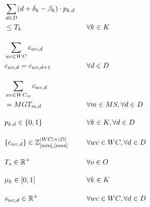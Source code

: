 \documentclass[runningheads]{llncs}
\begin{document}
\begin{alignat}{2}
    &\sum_{d \in D} (d + \delta_k - \beta_k) \cdot p_{k,d}                                      \ \ && \notag \\
    &\leq  T_k                                                                                  \ \ && \forall k \in K                              \label{eqn:tactical_tardiness} \\[1em]
    &\sum_{wc \in WC} c_{wc,d}                                                                  \ \ && \notag \\
    &c_{wc,d} = c_{wc,d+1}                                                                      \ \ && \forall d \in D                              \label{eqn:tactical_consistent_crew} \\[1em]
    &\sum_{wc \in WC_{m}} c_{wc,d}                                                              \ \ && \notag \\
    & = MGT_{m,d}                                                                               \ \ && \forall m \in MS, \forall d \in D            \label{eqn:tactical_multiskill} \\[1em]
    &p_{k,d} \in \{0,1\}                                                                        \ \ && \forall k \in K, \forall d \in D             \label{eqn:tactical_pattern_variable} \\[1em]
    &\{c_{wc,d}\} \in \mathbb{Z}^{|WC| \times |D|}_{[\text{min}], [\text{max}]}                 \ \ && \forall wc \in WC, \forall d \in D           \label{eqn:tactical_crew_variable} \\[1em]
    &T_o \in \mathbb{R}^{+}                                                                     \ \ && \forall o \in O                              \label{eqn:tactical_tardiness_variable} \\[1em]
    &\mu_k \in [0,1]                                                                            \ \ && \forall k \in K                              \label{eqn:tactical_finish_start_difference} \\[1em]
    &s_{wc,d} \in \mathbb{R}^{+}                                                                \ \ && \forall wc \in WC, \forall d \in D           \label{eqn:tactical_excess_capacity_variable}  
\end{alignat}




\end{document}
